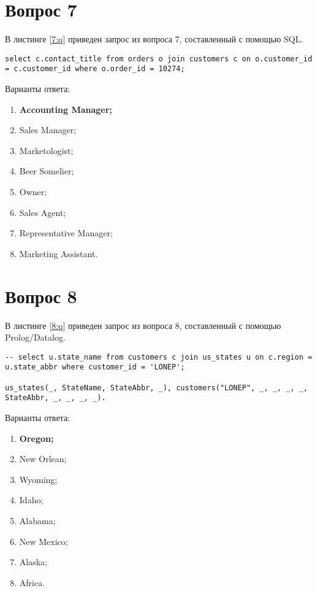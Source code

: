 \begin{appendices}
\section{Вопрос 7}

В листинге \ref{7:q} приведен запрос из вопроса 7, составленный с помощью SQL.

\begin{lstlisting}[label=7:q,caption=Вопрос 7]
select c.contact_title from orders o join customers c on o.customer_id = c.customer_id where o.order_id = 10274;
\end{lstlisting}

Варианты ответа:

\begin{enumerate}
	\item \textbf{Accounting Manager;}
	\item Sales Manager;
	\item Marketologist;
	\item Beer Somelier;
	\item Owner;
	\item Sales Agent;
	\item Representative Manager;
	\item Marketing Assistant.
\end{enumerate}

\section{Вопрос 8}

В листинге \ref{8:q} приведен запрос из вопроса 8, составленный с помощью Prolog/Datalog.

\begin{lstlisting}[label=8:q,caption=Вопрос 8]
-- select u.state_name from customers c join us_states u on c.region = u.state_abbr where customer_id = 'LONEP';

us_states(_, StateName, StateAbbr, _), customers("LONEP", _, _, _, _, StateAbbr, _, _, _, _).
\end{lstlisting}

Варианты ответа:

\begin{enumerate}
	\item \textbf{Oregon;}
	\item New Orlean;
	\item Wyoming;
	\item Idaho;
	\item Alabama;
	\item New Mexico;
	\item Alaska;
	\item Africa.
\end{enumerate}


\end{appendices}
